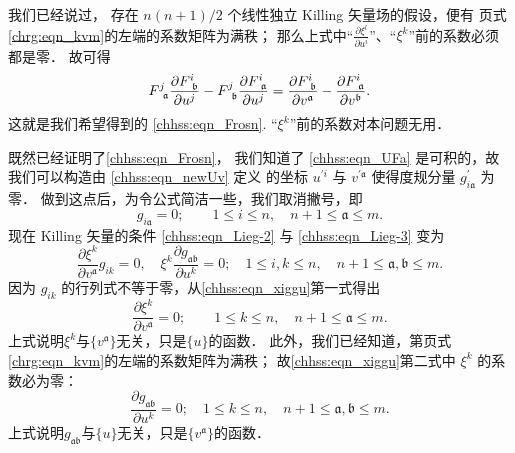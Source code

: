 我们已经说过， 存在 $n(n+1) / 2$ 个线性独立 Killing 矢量场的假设，便有
\pageref{chrg:eqn_kvm}页式\eqref{chrg:eqn_kvm}的左端的系数矩阵为满秩；
那么上式中“$\frac{\partial \xi^l}{\partial u^i} $”、“$\xi^k$”前的系数必须都是零．
故可得
\begin{equation}
    F^j_{\hphantom{j}\mathfrak{a}} \frac{\partial  F^{i}_{\hphantom{i}\mathfrak{b}}}{\partial u^j}
    -F^j_{\hphantom{j}\mathfrak{b}} \frac{\partial F^{i}_{\hphantom{i}\mathfrak{a}}}{\partial u^j}
    =\frac{\partial F^{i}_{\hphantom{i}\mathfrak{b}}}{\partial v^{\mathfrak{a}}}
    -\frac{\partial F^{i}_{\hphantom{i}\mathfrak{a}}}{\partial v^{\mathfrak{b}}}     .
\end{equation}
这就是我们希望得到的 \eqref{chhss:eqn_Frosn}.
“$\xi^k$”前的系数对本问题无用．


既然已经证明了\eqref{chhss:eqn_Frosn}，
我们知道了 \eqref{chhss:eqn_UFa} 是可积的，故我们可以构造由 \eqref{chhss:eqn_newUv} 定义
的坐标 $u^{\prime i}$ 与 $v^{\prime \mathfrak{a}}$ 使得度规分量 $g_{i \mathfrak{a}}^{\prime}$ 为零．
做到这点后，为令公式简洁一些，我们取消撇号，即
\begin{equation}\label{chhss:eqn_gia=0}
    g_{i \mathfrak{a}}=0 ; \qquad 1\leqslant i \leqslant n,\quad 
    n+1 \leqslant \mathfrak{a} \leqslant m.
\end{equation}
现在 Killing 矢量的条件 \eqref{chhss:eqn_Lieg-2} 与 \eqref{chhss:eqn_Lieg-3} 变为
\begin{equation}\label{chhss:eqn_xiggu}
    \frac{\partial \xi^k}{\partial v^{\mathfrak{a}}} g_{i k}=0, \quad
    \xi^k \frac{\partial g_{\mathfrak{ab}}}{\partial u^k}=0 ; \quad 
    1\leqslant i,k \leqslant n,\quad  n+1 \leqslant \mathfrak{a},\mathfrak{b} \leqslant m.
\end{equation}
因为 $g_{i k}$ 的行列式不等于零，从\eqref{chhss:eqn_xiggu}第一式得出
\begin{equation}\label{chhss:eqn_xi-u}
    \frac{\partial \xi^k}{\partial v^{\mathfrak{a}}}=0 ; \qquad 
    1\leqslant k \leqslant n,\quad  n+1 \leqslant \mathfrak{a} \leqslant m.
\end{equation}
上式说明$\xi^k$与$\{v^\mathfrak{a}\}$无关，只是$\{u\}$的函数．
此外，我们已经知道，第\pageref{chrg:eqn_kvm}页式\eqref{chrg:eqn_kvm}的左端的系数矩阵为满秩；
故\eqref{chhss:eqn_xiggu}第二式中 $\xi^k$ 的系数必为零：
\begin{equation}\label{chhss:eqn_gab-v}
    \frac{\partial g_{\mathfrak{ab}}}{\partial u^k}=0 ; \quad 
    1\leqslant k \leqslant n,\quad  n+1 \leqslant \mathfrak{a},\mathfrak{b} \leqslant m.
\end{equation}
上式说明$g_{\mathfrak{ab}}$与$\{u\}$无关，只是$\{v^\mathfrak{a}\}$的函数．


